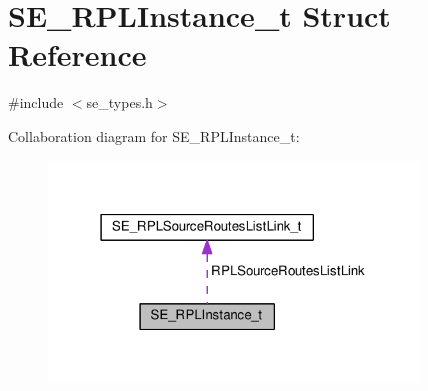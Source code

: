 \hypertarget{structSE__RPLInstance__t}{}\section{S\+E\+\_\+\+R\+P\+L\+Instance\+\_\+t Struct Reference}
\label{structSE__RPLInstance__t}


{\ttfamily \#include $<$se\+\_\+types.\+h$>$}



Collaboration diagram for S\+E\+\_\+\+R\+P\+L\+Instance\+\_\+t\+:\nopagebreak
\begin{figure}[H]
\begin{center}
\leavevmode
\includegraphics[width=279pt]{structSE__RPLInstance__t__coll__graph}
\end{center}
\end{figure}
